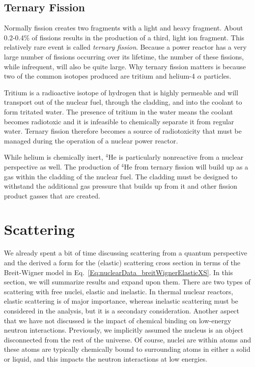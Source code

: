 \subsection{Ternary Fission}

Normally fission creates two fragments with a light and heavy fragment. About 0.2-0.4\% of fissions results in the production of a third, light ion fragment. This relatively rare event is called \emph{ternary fission}. Because a power reactor has a very large number of fissions occurring over its lifetime, the number of these fissions, while infrequent, will also be quite large. Why ternary fission matters is because two of the common isotopes produced are tritium and helium-4 $\alpha$ particles. 

Tritium is a radioactive isotope of hydrogen that is highly permeable and will transport out of the nuclear fuel, through the cladding, and into the coolant to form tritated water. The presence of tritium in the water means the coolant becomes radiotoxic and it is infeasible to chemically separate it from regular water. Ternary fission therefore becomes a source of radiotoxicity that must be managed during the operation of a nuclear power reactor.

While helium is chemically inert, $^4$He is particularly nonreactive from a nuclear perspective as well. The production of $^4$He from ternary fission will build up as a gas within the cladding of the nuclear fuel. The cladding must be designed to withstand the additional gas pressure that builds up from it and other fission product gasses that are created.


\section{Scattering}

We already spent a bit of time discussing scattering from a quantum perspective and the derived a form for the (elastic) scattering cross section in terms of the Breit-Wigner model in Eq.~\eqref{Eq:nuclearData_breitWignerElasticXS}. In this section, we will summarize results and expand upon them. There are two types of scattering with free nuclei, elastic and inelastic. In thermal nuclear reactors, elastic scattering is of major importance, whereas inelastic scattering must be considered in the analysis, but it is a secondary consideration. Another aspect that we have not discussed is the impact of chemical binding on low-energy neutron interactions. Previously, we implicitly assumed the nucleus is an object disconnected from the rest of the universe. Of course, nuclei are within atoms and these atoms are typically chemically bound to surrounding atoms in either a solid or liquid, and this impacts the neutron interactions at low energies.

